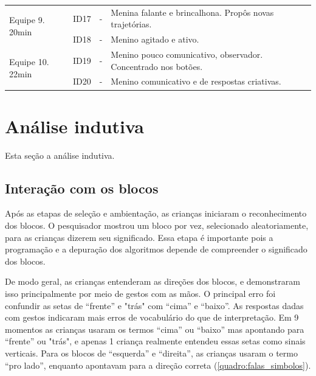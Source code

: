 \begin{quadro}[!h]
{\begin{footnotesize}
{\begin{tabular}{|l|l|l|p{11cm}|}
            \hline
            \multirow{2}{*}{Equipe 9. 20min}                & ID17              & -                            & Menina falante e brincalhona. Propôs novas trajetórias.                                                            \\ 
            \cline{2-4}
                                                            & ID18              & -                            & Menino agitado e ativo.                                                                                            \\ 
            \hline
            \multirow{2}{*}{Equipe 10. 22min}               & ID19              & -                            & Menino pouco comunicativo, observador. Concentrado nos botões.                                                     \\ 
            \cline{2-4}
                                                            & ID20              & -                            & Menino comunicativo e de respostas criativas.                                                                                    \\
            \hline
            \end{tabular}
        }
        \end{footnotesize}
    }
\end{quadro}

\section{Análise indutiva}

Esta seção a análise indutiva. 

\subsection{Interação com os blocos}

Após as etapas de seleção e ambientação, as crianças iniciaram o reconhecimento dos blocos. O pesquisador mostrou um bloco por vez, selecionado aleatoriamente, para as crianças dizerem seu significado. Essa etapa é importante pois a programação e a depuração dos algoritmos depende de compreender o significado dos blocos. 

De modo geral, as crianças entenderam as direções dos blocos, e demonstraram isso principalmente por meio de gestos com as mãos. O principal erro foi confundir as setas de “frente” e "trás" com “cima” e “baixo”. As respostas dadas com gestos indicaram mais erros de vocabulário do que de interpretação. Em 9 momentos as crianças usaram os termos “cima” ou “baixo” mas apontando para “frente” ou "trás", e apenas 1 criança realmente entendeu essas setas como sinais verticais. Para os blocos de “esquerda” e “direita”, as crianças usaram o termo “pro lado”, enquanto apontavam para a direção correta (\autoref{quadro:falas_simbolos}).

